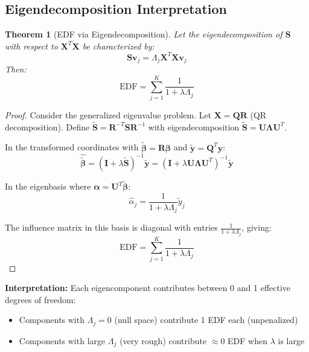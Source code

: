 \documentclass[12pt]{article}
\newtheorem{theorem}{Theorem}
\begin{document}
\subsection{Eigendecomposition Interpretation}

\begin{theorem}[EDF via Eigendecomposition]
Let the eigendecomposition of $\mathbf{S}$ with respect to $\mathbf{X}^T\mathbf{X}$ be characterized by:
\begin{equation}
\mathbf{S}\mathbf{v}_j = \Lambda_j \mathbf{X}^T\mathbf{X}\mathbf{v}_j
\end{equation}
Then:
\begin{equation}
\text{EDF} = \sum_{j=1}^K \frac{1}{1 + \lambda \Lambda_j}
\end{equation}
\end{theorem}

\begin{proof}
Consider the generalized eigenvalue problem. Let $\mathbf{X} = \mathbf{Q}\mathbf{R}$ (QR decomposition). Define $\tilde{\mathbf{S}} = \mathbf{R}^{-T}\mathbf{S}\mathbf{R}^{-1}$ with eigendecomposition $\tilde{\mathbf{S}} = \mathbf{U}\bm{\Lambda}\mathbf{U}^T$.

In the transformed coordinates with $\tilde{\bm{\beta}} = \mathbf{R}\bm{\beta}$ and $\tilde{\mathbf{y}} = \mathbf{Q}^T\mathbf{y}$:
\begin{equation}
\hat{\tilde{\bm{\beta}}} = (\mathbf{I} + \lambda\tilde{\mathbf{S}})^{-1}\tilde{\mathbf{y}} = (\mathbf{I} + \lambda\mathbf{U}\bm{\Lambda}\mathbf{U}^T)^{-1}\tilde{\mathbf{y}}
\end{equation}

In the eigenbasis where $\bm{\alpha} = \mathbf{U}^T\tilde{\bm{\beta}}$:
\begin{equation}
\hat{\alpha}_j = \frac{1}{1 + \lambda \Lambda_j} \tilde{y}_j
\end{equation}

The influence matrix in this basis is diagonal with entries $\frac{1}{1 + \lambda \Lambda_j}$, giving:
\begin{equation}
\text{EDF} = \sum_{j=1}^K \frac{1}{1 + \lambda \Lambda_j}
\end{equation}
\end{proof}

\textbf{Interpretation:} Each eigencomponent contributes between 0 and 1 effective degrees of freedom:
\begin{itemize}
    \item Components with $\Lambda_j = 0$ (null space) contribute 1 EDF each (unpenalized)
    \item Components with large $\Lambda_j$ (very rough) contribute $\approx 0$ EDF when $\lambda$ is large
\end{itemize}
\end{document}
